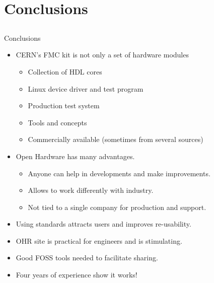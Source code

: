 \documentclass[compress,red]{beamer}
\begin{document}
\section{Conclusions}

\subsection*{} %

\begin{frame}{Conclusions}

  \begin{block}{}
    \begin{itemize}
    \item CERN's FMC kit is not only a set of hardware modules
      \begin{itemize}
      \item Collection of HDL cores
      \item Linux device driver and test program
      \item Production test system
      \item Tools and concepts %
      \item Commercially available (sometimes from several sources)
      \end{itemize}
    \item Open Hardware has many advantages.
      \begin{itemize}
      \item Anyone can help in developments and make improvements.
      \item Allows to work differently with industry. %
      \item Not tied to a single company for production and support.
      \end{itemize}
    \item Using standards attracts users and improves re-usability. %
    \item OHR site is practical for engineers and is stimulating.
    \item Good FOSS tools needed to facilitate sharing.
    \item Four years of experience show it works!
    \end{itemize}
  \end{block}

  \note[item]{}

\end{frame}
\end{document}
